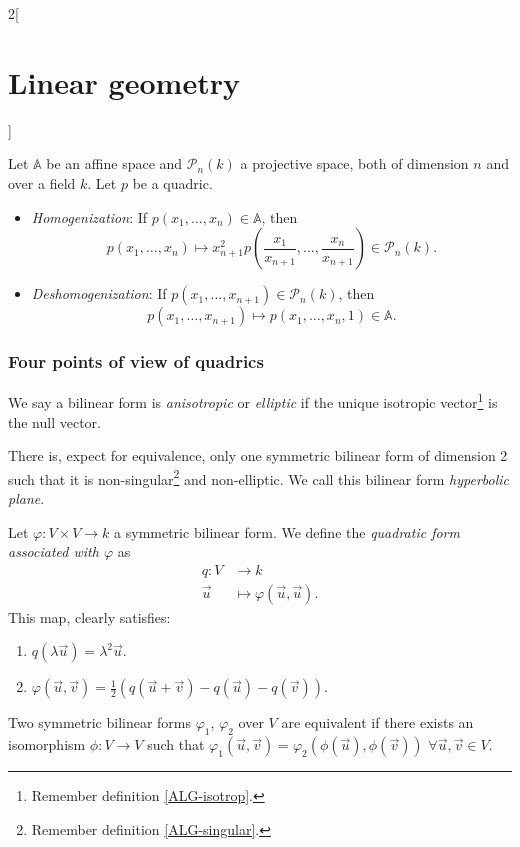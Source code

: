 \documentclass[../../../main.tex]{subfiles}
\begin{document}
\begin{multicols}{2}[\section{Linear geometry}]
\begin{theorem}
\end{theorem}
\begin{prop}
Let $\mathbb{A}$ be an affine space and $\mathcal{P}_n(k)$ a projective space, both of dimension $n$ and over a field $k$. Let $p$ be a quadric. 
\begin{itemize}
    \item\textit{Homogenization}: If $p(x_1,\ldots,x_n)\in\mathbb{A}$, then $$p(x_1,\ldots,x_n)\mapsto x_{n+1}^2p\left(\frac{x_1}{x_{n+1}},\ldots,\frac{x_n}{x_{n+1}}\right)\in\mathcal{P}_n(k).$$
    \item\textit{Deshomogenization}: If $p(x_1,\ldots,x_{n+1})\in\mathcal{P}_n(k)$, then $$p(x_1,\ldots,x_{n+1})\mapsto p(x_1,\ldots,x_n,1)\in\mathbb{A}.$$
\end{itemize}
\end{prop}
\subsubsection*{Four points of view of quadrics}
\begin{definition}
We say a bilinear form is \textit{anisotropic} or \textit{elliptic} if the unique isotropic vector\footnote{Remember definition \ref{ALG-isotrop}.} is the null vector.
\end{definition}
\begin{theorem}
There is, expect for equivalence, only one symmetric bilinear form of dimension 2 such that it is non-singular\footnote{Remember definition \ref{ALG-singular}.} and non-elliptic. We call this bilinear form \textit{hyperbolic plane}.
\end{theorem}
\begin{definition}
Let $\varphi:V\times V\rightarrow k$ a symmetric bilinear form. We define the \textit{quadratic form associated with $\varphi$} as 
\begin{align*}
    q:V&\longrightarrow k\\
    \vec{u}&\longmapsto\varphi(\vec{u},\vec{u}).
\end{align*} This map, clearly satisfies:
\begin{enumerate}
    \item $q(\lambda\vec{u})=\lambda^2\vec{u}$.
    \item $\displaystyle\varphi(\vec{u},\vec{v})=\frac{1}{2}\left(q(\vec{u}+\vec{v})-q(\vec{u})-q(\vec{v})\right)$.
\end{enumerate}
\end{definition}
\begin{prop}
Two symmetric bilinear forms $\varphi_1$, $\varphi_2$ over $V$ are equivalent if there exists an isomorphism $\phi:V\rightarrow V$ such that $\varphi_1(\vec{u},\vec{v})=\varphi_2(\phi(\vec{u}),\phi(\vec{v}))$ $\forall\vec{u},\vec{v}\in V$.\newline

\end{prop}
\end{multicols}
\end{document}
